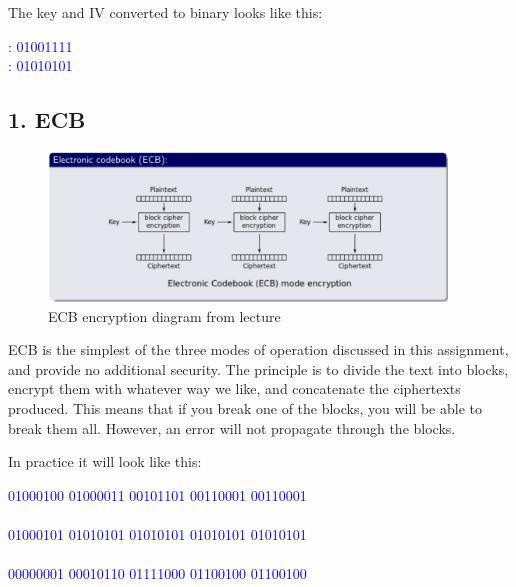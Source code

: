 \documentclass{article}
\begin{document}
The key and IV converted to binary looks like this: 
\begin{tcolorbox}
\begin{center}
\textcolor{blue}{
: 01001111\\
: 01010101}
\end{center}
\end{tcolorbox}



\newpage
\subsection{1. ECB}

\begin{figure}[H]
 \centering
  \includegraphics[width=300pt]{img/ecbLecture.png}
 \caption{ECB encryption diagram from lecture}
 \end{figure}


ECB is the simplest of the three modes of operation discussed in this assignment, and provide no additional security. The principle is to divide the text into blocks, encrypt them with whatever way we like, and concatenate the ciphertexts produced. This means that if you break one of the blocks, you will be able to break them all. However, an error will not propagate through the blocks. 

In practice it will look like this:
\begin{scriptsize}
\begin{tcolorbox}
\begin{center}
\textcolor{blue}{
 01000100 01000011 00101101 00110001 00110001\\
\qquad  {}\qquad  {}\qquad  {}\\
01000101 01010101 01010101 01010101 01010101\\
\makebox[1.5cm]{\textbf{=}}\\
00000001 00010110 01111000 01100100 01100100
}

\end{center}
\end{tcolorbox}
\end{scriptsize}
\end{document}
